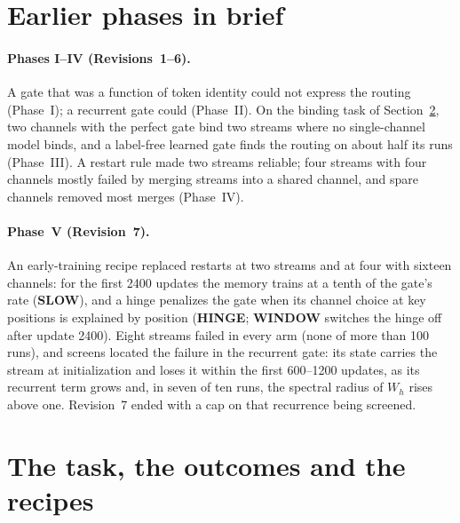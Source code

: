 \documentclass[11pt]{article}
\begin{document}
\section{Earlier phases in brief}
\label{sec:prior}

\paragraph{Phases I--IV (Revisions~1--6).} A gate that was a function of token identity could not express the routing (Phase~I); a recurrent gate could (Phase~II). On the binding task of Section~\ref{sec:task}, two channels with the perfect gate bind two streams where no single-channel model binds, and a label-free learned gate finds the routing on about half its runs (Phase~III). A restart rule made two streams reliable; four streams with four channels mostly failed by merging streams into a shared channel, and spare channels removed most merges (Phase~IV).

\paragraph{Phase~V (Revision~7).} An early-training recipe replaced restarts at two streams and at four with sixteen channels: for the first 2400 updates the memory trains at a tenth of the gate's rate (\textbf{SLOW}), and a hinge penalizes the gate when its channel choice at key positions is explained by position (\textbf{HINGE}; \textbf{WINDOW} switches the hinge off after update 2400). Eight streams failed in every arm (none of more than 100 runs), and screens located the failure in the recurrent gate: its state carries the stream at initialization and loses it within the first 600--1200 updates, as its recurrent term grows and, in seven of ten runs, the spectral radius of $W_h$ rises above one. Revision~7 ended with a cap on that recurrence being screened.

\section{The task, the outcomes and the recipes}
\label{sec:task}
\end{document}
